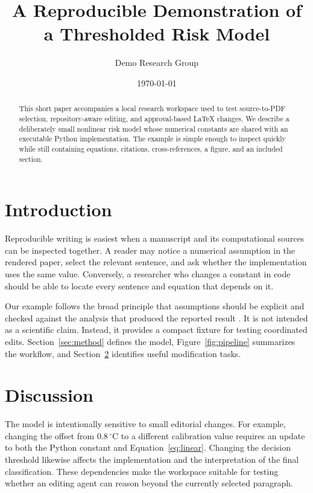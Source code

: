 \documentclass[11pt]{article}
\title{A Reproducible Demonstration of a Thresholded Risk Model}
\author{Demo Research Group}
\date{\today}
\begin{document}
\maketitle

\begin{abstract}
This short paper accompanies a local research workspace used to test
source-to-PDF selection, repository-aware editing, and approval-based LaTeX
changes.  We describe a deliberately small nonlinear risk model whose numerical
constants are shared with an executable Python implementation.  The example is
simple enough to inspect quickly while still containing equations, citations,
cross-references, a figure, and an included section.
\end{abstract}

\section{Introduction}
Reproducible writing is easiest when a manuscript and its computational sources
can be inspected together.  A reader may notice a numerical assumption in the
rendered paper, select the relevant sentence, and ask whether the implementation
uses the same value.  Conversely, a researcher who changes a constant in code
should be able to locate every sentence and equation that depends on it.

Our example follows the broad principle that assumptions should be explicit and
checked against the analysis that produced the reported result
\cite{gelman2013bayesian}.  It is not intended as a scientific claim.  Instead,
it provides a compact fixture for testing coordinated edits.  Section~\ref{sec:method}
defines the model, Figure~\ref{fig:pipeline} summarizes the workflow, and
Section~\ref{sec:discussion} identifies useful modification tasks.



\section{Discussion}
\label{sec:discussion}
The model is intentionally sensitive to small editorial changes.  For example,
changing the offset from $0.8\,^{\circ}\mathrm{C}$ to a different calibration
value requires an update to both the Python constant and Equation~\eqref{eq:linear}.
Changing the decision threshold likewise affects the implementation and the
interpretation of the final classification.  These dependencies make the
workspace suitable for testing whether an editing agent can reason beyond the
currently selected paragraph.
\end{document}
